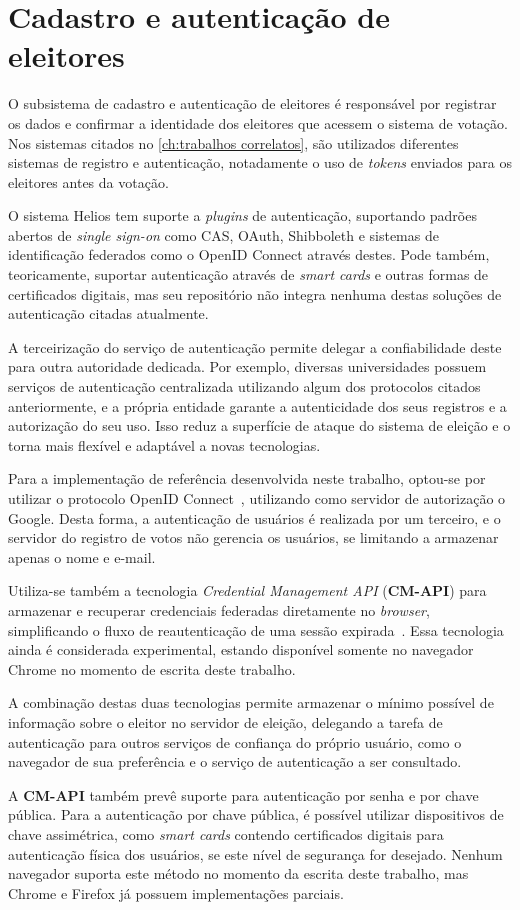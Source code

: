 \section{Cadastro e autenticação de eleitores}

O subsistema de cadastro e autenticação de eleitores é responsável por
registrar os dados e confirmar a identidade dos eleitores que acessem o sistema
de votação. Nos sistemas citados no \autoref{ch:trabalhos correlatos}, são
utilizados diferentes sistemas de registro e autenticação, notadamente o uso de
\textit{tokens} enviados para os eleitores antes da votação.

O sistema Helios tem suporte a \textit{plugins} de autenticação, suportando
padrões abertos de \textit{single sign-on} como CAS, OAuth, Shibboleth e
sistemas de identificação federados como o OpenID Connect através destes. Pode
também, teoricamente, suportar autenticação através de \textit{smart cards} e
outras formas de certificados digitais, mas seu repositório não integra nenhuma
destas soluções de autenticação citadas atualmente.

A terceirização do serviço de autenticação permite delegar a confiabilidade
deste para outra autoridade dedicada. Por exemplo, diversas universidades
possuem serviços de autenticação centralizada utilizando algum dos protocolos
citados anteriormente, e a própria entidade garante a autenticidade dos seus
registros e a autorização do seu uso. Isso reduz a superfície de ataque do
sistema de eleição e o torna mais flexível e adaptável a novas tecnologias.

Para a implementação de referência desenvolvida neste trabalho, optou-se por
utilizar o protocolo OpenID Connect~\cite{sakimura2014openid}, utilizando como
servidor de autorização o Google. Desta forma, a autenticação de usuários é
realizada por um terceiro, e o servidor do registro de votos não gerencia os
usuários, se limitando a armazenar apenas o nome e e-mail.

Utiliza-se também a tecnologia \textit{Credential Management API}
(\textbf{CM-API}) para armazenar e recuperar credenciais federadas diretamente
no \textit{browser}, simplificando o fluxo de reautenticação de uma sessão
expirada~\cite{Credenti82:online}. Essa tecnologia ainda é considerada
experimental, estando disponível somente no navegador Chrome no momento de
escrita deste trabalho.

A combinação destas duas tecnologias permite armazenar o mínimo possível de
informação sobre o eleitor no servidor de eleição, delegando a tarefa de
autenticação para outros serviços de confiança do próprio usuário, como o
navegador de sua preferência e o serviço de autenticação a ser consultado.

A \textbf{CM-API} também prevê suporte para autenticação por senha e por chave
pública. Para a autenticação por chave pública, é possível utilizar
dispositivos de chave assimétrica, como \textit{smart cards} contendo
certificados digitais para autenticação física dos usuários, se este nível de
segurança for desejado. Nenhum navegador suporta este método no momento da
escrita deste trabalho, mas Chrome e Firefox já possuem implementações
parciais.
